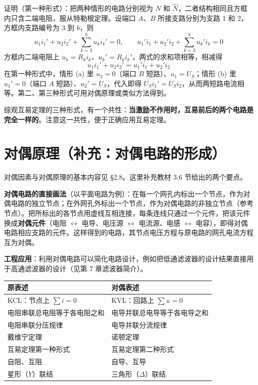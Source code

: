 证明（第一种形式）：把两种情形的电路分别视为 $N$ 和 $\hat{N}$，二者结构相同且方框内只含二端电阻，服从特勒根定理。设端口 $A$、$B$ 所接支路分别为支路 1 和 2，方框内支路编号为 3 到 $b$，则
\begin{equation}
u_1i_1'+u_2i_2'+\sum_{k=3}^{b}u_ki_k'=0,
\qquad
u_1'i_1+u_2'i_2+\sum_{k=3}^{b}u_k'i_k=0
\end{equation}
方框内二端电阻上 $u_k=R_ki_k$、$u_k'=R_ki_k'$，两式的求和项相等，相减得
\begin{equation}
u_1i_1'+u_2i_2'=u_1'i_1+u_2'i_2
\end{equation}
在第一种形式中，情形 (a) 里 $u_2=0$（端口 $B$ 短路）、$u_1=U_S$；情形 (b) 里 $u_1'=0$（端口 $A$ 短路）、$u_2'=U_S$，代入即得 $U_Si_1'=U_Si_2$，从而两短路电流相等。第二、第三种形式可用对偶原理或类似方法得到。

综观互易定理的三种形式，有一个共性：\textbf{当激励不作用时，互易前后的两个电路是完全一样的}。注意这一共性，便于正确应用互易定理。


\section{对偶原理（补充：对偶电路的形成）}
对偶因素与对偶原理的基本内容见 §2.8。这里补充教材 3.6 节给出的两个要点。

\textbf{对偶电路的直接画法}（以平面电路为例）：在每一个网孔内标出一个节点，作为对偶电路的独立节点；在外网孔外标出一个节点，作为对偶电路的非独立节点（参考节点）。把所标出的各节点用虚线互相连接，每条连线只通过一个元件，把该元件换成\textbf{对偶元件}（电阻 $\leftrightarrow$ 电导、电压源 $\leftrightarrow$ 电流源、电感 $\leftrightarrow$ 电容），即得对偶电路相应支路的元件。这样得到的电路，其节点电压方程与原电路的网孔电流方程互为对偶。

\textbf{工程应用}：利用对偶电路可以简化电路设计，例如把低通滤波器的设计结果直接用于高通滤波器的设计（见第 7 章滤波器简介）。

\begin{center}
\begin{tabular}{@{}ll@{}}
\toprule
原表述 & 对偶表述 \\
\midrule
KCL：节点上 $\sum i=0$ & KVL：回路上 $\sum u=0$ \\
电阻串联总电阻等于各电阻之和 & 电导并联总电导等于各电导之和 \\
电阻串联分压规律 & 电导并联分流规律 \\
戴维宁定理 & 诺顿定理 \\
互易定理第一种形式 & 互易定理第二种形式 \\
自阻、互阻 & 自导、互导 \\
星形（$Y$）联结 & 三角形（$\Delta$）联结 \\
\bottomrule
\end{tabular}
\end{center}

